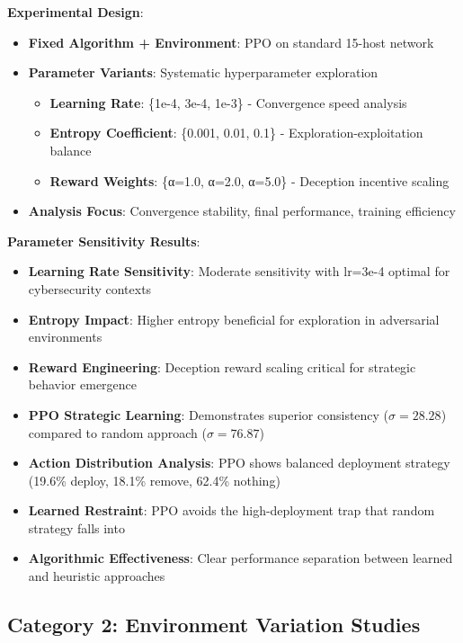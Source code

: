 \documentclass[12pt]{article}
\theoremstyle{definition}
\theoremstyle{plain}
\begin{document}
\textbf{Experimental Design}:
\begin{itemize}
\item \textbf{Fixed Algorithm + Environment}: PPO on standard 15-host network
\item \textbf{Parameter Variants}: Systematic hyperparameter exploration
  \begin{itemize}
    \item \textbf{Learning Rate}: \{1e-4, 3e-4, 1e-3\} - Convergence speed analysis
    \item \textbf{Entropy Coefficient}: \{0.001, 0.01, 0.1\} - Exploration-exploitation balance
    \item \textbf{Reward Weights}: \{α=1.0, α=2.0, α=5.0\} - Deception incentive scaling
  \end{itemize}
\item \textbf{Analysis Focus}: Convergence stability, final performance, training efficiency
\end{itemize}

\textbf{Parameter Sensitivity Results}:
\begin{itemize}
\item \textbf{Learning Rate Sensitivity}: Moderate sensitivity with lr=3e-4 optimal for cybersecurity contexts
\item \textbf{Entropy Impact}: Higher entropy beneficial for exploration in adversarial environments
\item \textbf{Reward Engineering}: Deception reward scaling critical for strategic behavior emergence
\end{itemize}
\begin{itemize}
\item \textbf{PPO Strategic Learning}: Demonstrates superior consistency ($\sigma=28.28$) compared to random approach ($\sigma=76.87$)
\item \textbf{Action Distribution Analysis}: PPO shows balanced deployment strategy (19.6\% deploy, 18.1\% remove, 62.4\% nothing)
\item \textbf{Learned Restraint}: PPO avoids the high-deployment trap that random strategy falls into
\item \textbf{Algorithmic Effectiveness}: Clear performance separation between learned and heuristic approaches
\end{itemize}

\subsection{Category 2: Environment Variation Studies}
\end{document}

